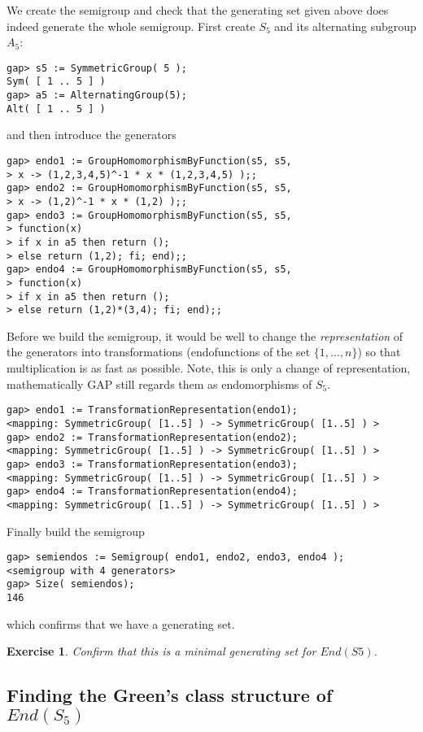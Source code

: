 \documentclass{ws-p8-50x6-00}
\theoremstyle{plain} \newtheorem{Thm}{Theorem}
\theoremstyle{plain} \newtheorem{Cor}{Corollary}
\theoremstyle{plain} \newtheorem{Lemma}{Lemma}
\theoremstyle{plain} \newtheorem{Prop}{Proposition}
\theoremstyle{plain} \newtheorem{Ex}{Exercise}
\def\gap{\sf GAP}
\begin{document}
We create the semigroup and check that the generating
set given above does indeed generate the whole semigroup.
First create $S_5$ and its alternating subgroup $A_5$:
\begin{verbatim}
gap> s5 := SymmetricGroup( 5 );
Sym( [ 1 .. 5 ] )
gap> a5 := AlternatingGroup(5);
Alt( [ 1 .. 5 ] )
\end{verbatim}
and then introduce the generators 
\begin{verbatim}
gap> endo1 := GroupHomomorphismByFunction(s5, s5,                     
> x -> (1,2,3,4,5)^-1 * x * (1,2,3,4,5) );;
gap> endo2 := GroupHomomorphismByFunction(s5, s5,
> x -> (1,2)^-1 * x * (1,2) );;
gap> endo3 := GroupHomomorphismByFunction(s5, s5,
> function(x) 
> if x in a5 then return (); 
> else return (1,2); fi; end);;
gap> endo4 := GroupHomomorphismByFunction(s5, s5,
> function(x) 
> if x in a5 then return (); 
> else return (1,2)*(3,4); fi; end);;
\end{verbatim}

Before we build the semigroup, it would be well to change the 
{\em representation} of the generators into transformations
(endofunctions of the set $\{1, \ldots, n\}$)
so that multiplication is as fast as possible. Note, this is only 
a change of representation, mathematically {\gap} still regards them
as endomorphisms of $S_5$.
\begin{verbatim}
gap> endo1 := TransformationRepresentation(endo1);
<mapping: SymmetricGroup( [1..5] ) -> SymmetricGroup( [1..5] ) >
gap> endo2 := TransformationRepresentation(endo2);
<mapping: SymmetricGroup( [1..5] ) -> SymmetricGroup( [1..5] ) >
gap> endo3 := TransformationRepresentation(endo3);
<mapping: SymmetricGroup( [1..5] ) -> SymmetricGroup( [1..5] ) >
gap> endo4 := TransformationRepresentation(endo4);
<mapping: SymmetricGroup( [1..5] ) -> SymmetricGroup( [1..5] ) >
\end{verbatim}
Finally build the semigroup
\begin{verbatim}
gap> semiendos := Semigroup( endo1, endo2, endo3, endo4 );
<semigroup with 4 generators>
gap> Size( semiendos);
146
\end{verbatim}
which confirms that we have a generating set.

\begin{Ex}
Confirm that this is a minimal generating set for $End(S5)$.
\end{Ex}

\subsection{Finding the Green's class structure of $End(S_5)$}
        
\end{document}
